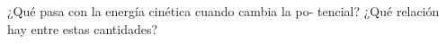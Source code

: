 ¿Qué pasa con la energía cinética cuando cambia la po-
tencial? ¿Qué relación hay entre estas cantidades?


\begin{solutionbox}{1.5cm}

\end{solutionbox}
